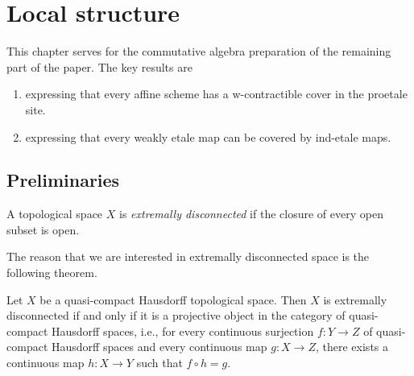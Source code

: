 \chapter{Local structure}

This chapter serves for the commutative algebra preparation of the remaining part of the paper. The key results are
\begin{enumerate}
  \item {} expressing that every affine scheme has a w-contractible cover in the proetale site.
  \item {} expressing that every weakly etale map can be covered by ind-etale maps.
\end{enumerate}

\section{Preliminaries}

\begin{definition}
  \label{def:extremally-disconnected}
  \mathlibok

  A topological space \(X\) is \emph{extremally disconnected} if the closure of every open subset is open.
\end{definition}

The reason that we are interested in extremally disconnected space is the following theorem.

\begin{theorem}
  \label{thm:extremally-disconnected-projective}
  \mathlibok
  Let \(X\) be a quasi-compact Hausdorff topological space. Then \(X\) is extremally disconnected if and only if it is a projective object in the category of quasi-compact Hausdorff spaces, i.e., for every continuous surjection \(f : Y \to Z\) of quasi-compact Hausdorff spaces and every continuous map \(g : X \to Z\), there exists a continuous map \(h : X \to Y\) such that \(f \circ h = g\).
\end{theorem}

